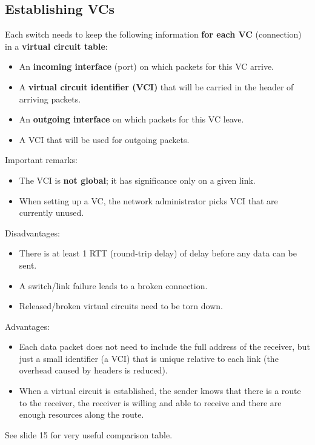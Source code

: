 \documentclass[11pt]{article}
\begin{document}
\subsection{Establishing VCs}
\label{sec:org03a67ce}
Each switch needs to keep the following information \textbf{for each VC} (connection) in a \textbf{virtual circuit table}:
\begin{itemize}
\item An \textbf{incoming interface} (port) on which packets for this VC arrive.
\item A \textbf{virtual circuit identifier (VCI)} that will be carried in the header of arriving packets.
\item An \textbf{outgoing interface} on which packets for this VC leave.
\item A VCI that will be used for outgoing packets.
\end{itemize}
Important remarks:
\begin{itemize}
\item The VCI is \textbf{not global}; it has significance only on a given link.
\item When setting up a VC, the network administrator picks VCI that are currently unused.
\end{itemize}
Disadvantages:
\begin{itemize}
\item There is at least 1 RTT (round-trip delay) of delay before any data can be sent.
\item A switch/link failure leads to a broken connection.
\item Released/broken virtual circuits need to be torn down.
\end{itemize}
Advantages:
\begin{itemize}
\item Each data packet does not need to include the full address of the receiver, but just a small identifier (a VCI) that is unique relative to each link (the overhead caused by headers is reduced).
\item When a virtual circuit is established, the sender knows that there is a route to the receiver, the receiver is willing and able to receive and there are enough resources along the route.
\end{itemize}
See slide 15 for very useful comparison table.
\end{document}
